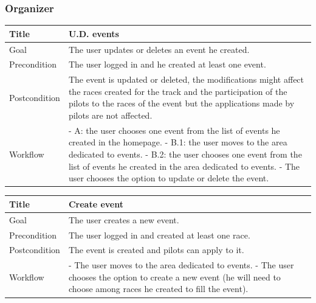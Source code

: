 \documentclass{beamer}
\begin{document}
\begin{frame}
    \frametitle{Organizer}
    \begin{table}
        \tiny
        \begin{tabular}{|p{2cm}|p{6cm}|}
        \hline
        Title & \textbf{U.D. events} \\
        \hline
        Goal & The user updates or deletes an event he created. \\
        \hline
        Precondition & The user logged in and he created at least one event. \\
        \hline
        Postcondition & The event is updated or deleted, the modifications might affect the races created for the track 
        and the participation of the pilots to the races of the event but the applications made by pilots are not affected. \\
        \hline
        Workflow &
        - A: the user chooses one event from the list of events he created in the homepage. \newline
        - B.1: the user moves to the area dedicated to events. \newline
        - B.2: the user chooses one event from the list of events he created in the area dedicated to events. \newline
        - The user chooses the option to update or delete the event. \\
        \hline
        \end{tabular}
\end{table}

\begin{table}
    \tiny
    \begin{tabular}{|p{2cm}|p{6cm}|}
    \hline
    Title & \textbf{Create event} \\
    \hline
    Goal & The user creates a new event. \\
    \hline
    Precondition & The user logged in and created at least one race.\\
    \hline
    Postcondition & The event is created and pilots can apply to it. \\
    \hline
    Workflow &
    - The user moves to the area dedicated to events. \newline
    - The user chooses the option to create a new event (he will need to choose among races he created
    to fill the event). \\
    \hline
    \end{tabular}
\end{table}

\end{frame}
\end{document}
